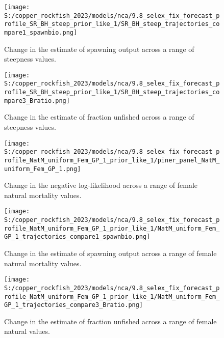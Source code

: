 \documentclass[11pt,
  english,
  letterpaper,
]{article}
\begin{document}
\pagebreak

\begin{figure}
\centering
\texttt{[image: S:/copper\_rockfish\_2023/models/nca/9.8\_selex\_fix\_forecast\_profile\_SR\_BH\_steep\_prior\_like\_1/SR\_BH\_steep\_trajectories\_compare1\_spawnbio.png]}
\caption{Change in the estimate of spawning output across a range of steepness values.\label{fig:h-ssb}}
\end{figure}

\pagebreak

\begin{figure}
\centering
\texttt{[image: S:/copper\_rockfish\_2023/models/nca/9.8\_selex\_fix\_forecast\_profile\_SR\_BH\_steep\_prior\_like\_1/SR\_BH\_steep\_trajectories\_compare3\_Bratio.png]}
\caption{Change in the estimate of fraction unfished across a range of steepness values.\label{fig:h-depl}}
\end{figure}

\pagebreak

\begin{figure}
\centering
\texttt{[image: S:/copper\_rockfish\_2023/models/nca/9.8\_selex\_fix\_forecast\_profile\_NatM\_uniform\_Fem\_GP\_1\_prior\_like\_1/piner\_panel\_NatM\_uniform\_Fem\_GP\_1.png]}
\caption{Change in the negative log-likelihood across a range of female natural mortality values.\label{fig:m-profile}}
\end{figure}

\pagebreak

\begin{figure}
\centering
\texttt{[image: S:/copper\_rockfish\_2023/models/nca/9.8\_selex\_fix\_forecast\_profile\_NatM\_uniform\_Fem\_GP\_1\_prior\_like\_1/NatM\_uniform\_Fem\_GP\_1\_trajectories\_compare1\_spawnbio.png]}
\caption{Change in the estimate of spawning output across a range of female natural mortality values.\label{fig:m-ssb}}
\end{figure}

\pagebreak

\begin{figure}
\centering
\texttt{[image: S:/copper\_rockfish\_2023/models/nca/9.8\_selex\_fix\_forecast\_profile\_NatM\_uniform\_Fem\_GP\_1\_prior\_like\_1/NatM\_uniform\_Fem\_GP\_1\_trajectories\_compare3\_Bratio.png]}
\caption{Change in the estimate of fraction unfished across a range of female natural values.\label{fig:m-depl}}
\end{figure}
\end{document}
